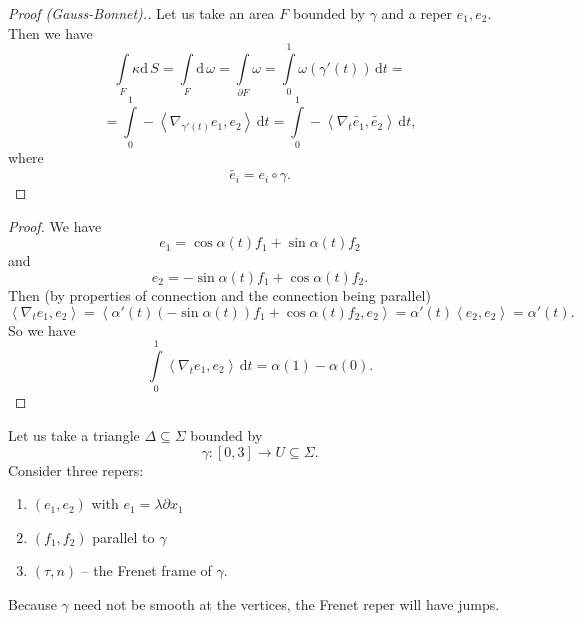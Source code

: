 \begin{proof}[Proof (Gauss-Bonnet).]
Let us take an area \( F \) bounded by \( \gamma \) and a reper \( e_1, e_2 \). Then we have
\[ 
    \int\limits_{F} \kappa \mathrm{d}\,S =  \int\limits_{F} \mathrm{d}\,\omega = \int\limits_{ \partial F} \omega = \int\limits_{0}^{1} \omega( \gamma' (t) ) \,\mathrm{d} t =
\]
\[ 
    = \int\limits_{0}^{1} - \left\langle \nabla_{\gamma'(t)}e_1, e_2 \right\rangle  \,\mathrm{d} t = \int\limits_{0}^{1} - \left\langle \nabla_t \widetilde{e_1}, \widetilde{e_2} \right\rangle  \,\mathrm{d}t,
\]
where
\[ 
    \widetilde{e_i} = e_i \circ \gamma.
\]
\end{proof}

\begin{proof}
We have
\[ 
    e_1 = \cos\alpha(t) f_1 + \sin\alpha(t)f_2
\]
and
\[ 
    e_2 = -\sin\alpha(t) f_1 + \cos\alpha(t)f_2. 
\]
Then (by properties of connection and the connection being parallel)
\[ 
    \left\langle \nabla_t e_1, e_2 \right\rangle = \left\langle \alpha'(t) (-\sin \alpha(t))f_1 + \cos\alpha(t) f_2, e_2 \right\rangle  = \alpha'(t) \left\langle e_2, e_2 \right\rangle = \alpha'(t).
\]
So we have
\[ 
    \int\limits_{0}^{1} \left\langle \nabla_t e_1, e_2 \right\rangle  \,\mathrm{d} t = \alpha(1) - \alpha(0).
\]
\end{proof}

Let us take a triangle \( \Delta \subseteq \Sigma \) bounded by
\[ 
    \gamma : [0, 3] \to U \subseteq \Sigma.
\]
Consider three repers:
\begin{enumerate}
    \item \( (e_1, e_2) \) with \( e_1 = \lambda \partial x_1 \)
    \item \( (f_1, f_2) \) parallel to \( \gamma \)
    \item \( (\tau, n) \) -- the Frenet frame of \( \gamma \).
\end{enumerate}

Because \( \gamma \) need not be smooth at the vertices, the Frenet reper will have jumps.
